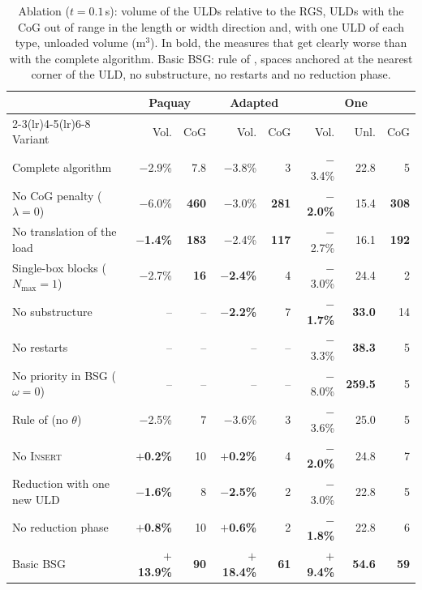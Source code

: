 \begin{table}[htbp]
\centering
\footnotesize\setlength{\tabcolsep}{3.5pt}
\caption{Ablation ($t = 0.1$\,s): volume of the ULDs relative to the RGS, ULDs with the CoG out
of range in the length or width direction and, with one ULD of each type, unloaded volume
(m$^3$). In bold, the measures that get clearly worse than with the complete algorithm. Basic BSG:
rule of \citet{Hessler2025}, spaces anchored at the nearest corner of the ULD, no substructure,
no restarts and no reduction phase.}
\label{tab:ablation}
\begin{tabular}{lrrrrrrr}
\toprule
 & \multicolumn{2}{c}{Paquay} & \multicolumn{2}{c}{Adapted} & \multicolumn{3}{c}{One} \\
\cmidrule(lr){2-3}\cmidrule(lr){4-5}\cmidrule(lr){6-8}
Variant & Vol. & CoG & Vol. & CoG & Vol. & Unl. & CoG \\
\midrule
Complete algorithm & $-$2.9\% & 7.8 & $-$3.8\% & 3 & $-$3.4\% & 22.8 & 5 \\
\midrule
No CoG penalty ($\lambda = 0$) & $-$6.0\% & \textbf{460} & $-$3.0\% & \textbf{281} & \textbf{$-$2.0\%} & 15.4 & \textbf{308} \\
No translation of the load & \textbf{$-$1.4\%} & \textbf{183} & $-$2.4\% & \textbf{117} & $-$2.7\% & 16.1 & \textbf{192} \\
Single-box blocks ($N_{\max} = 1$) & $-$2.7\% & \textbf{16} & \textbf{$-$2.4\%} & 4 & $-$3.0\% & 24.4 & 2 \\
No substructure & -- & -- & \textbf{$-$2.2\%} & 7 & \textbf{$-$1.7\%} & \textbf{33.0} & 14 \\
No restarts & -- & -- & -- & -- & $-$3.3\% & \textbf{38.3} & 5 \\
No priority in BSG ($\omega = 0$) & -- & -- & -- & -- & $-$8.0\% & \textbf{259.5} & 5 \\
Rule of \citet{Hessler2025} (no $\theta$) & $-$2.5\% & 7 & $-$3.6\% & 3 & $-$3.6\% & 25.0 & 5 \\
\midrule
No \textsc{Insert} & \textbf{$+$0.2\%} & 10 & \textbf{$+$0.2\%} & 4 & \textbf{$-$2.0\%} & 24.8 & 7 \\
Reduction with one new ULD & \textbf{$-$1.6\%} & 8 & \textbf{$-$2.5\%} & 2 & $-$3.0\% & 22.8 & 5 \\
No reduction phase & \textbf{$+$0.8\%} & 10 & \textbf{$+$0.6\%} & 2 & \textbf{$-$1.8\%} & 22.8 & 6 \\
\midrule
Basic BSG & \textbf{$+$13.9\%} & \textbf{90} & \textbf{$+$18.4\%} & \textbf{61} & \textbf{$+$9.4\%} & \textbf{54.6} & \textbf{59} \\
\bottomrule
\end{tabular}
\end{table}

